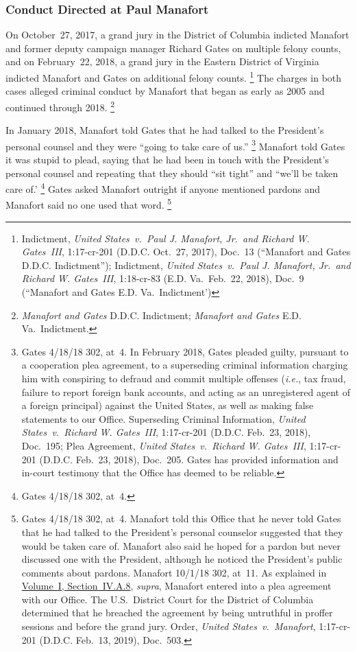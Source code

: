 \subsubsection{Conduct Directed at Paul Manafort}

On October~27, 2017, a grand jury in the District of Columbia indicted Manafort and former deputy campaign manager Richard Gates on multiple felony counts, and on February~22, 2018, a grand jury in the Eastern District of Virginia indicted Manafort and Gates on additional felony counts.%
\footnote{Indictment, \textit{United States~v.\ Paul J. Manafort, Jr.\ and Richard W. Gates~III}, 1:17-cr-201 (D.D.C. Oct.~27, 2017), Doc.~13 (``Manafort and Gates D.D.C. Indictment'');
Indictment, \textit{United States~v.\ Paul J. Manafort, Jr.\ and Richard W. Gates~III}, 1:18-cr-83 (E.D. Va.\ Feb.~22, 2018), Doc.~9 (``Manafort and Gates E.D. Va.\ Indictment')}
The charges in both cases alleged criminal conduct by Manafort that began as early as 2005 and continued through 2018.%
\footnote{\textit{Manafort and Gates} D.D.C. Indictment; \textit{Manafort and Gates} E.D. Va.\ Indictment.}

In January 2018, Manafort told Gates that he had talked to the President's personal counsel and they were ``going to take care of us.''%
\footnote{Gates 4/18/18 302, at~4.
In February 2018, Gates pleaded guilty, pursuant to a cooperation plea agreement, to a superseding criminal information charging him with conspiring to defraud and commit multiple offenses (\textit{i.e.}, tax fraud, failure to report foreign bank accounts, and acting as an unregistered agent of a foreign principal) against the United States, as well as making false statements to our Office.
Superseding Criminal Information, \textit{United States~v.\ Richard W. Gates~III}, 1:17-cr-201 (D.D.C. Feb.~23, 2018), Doc.~195;
Plea Agreement, \textit{United States~v.\ Richard W. Gates~III}, 1:17-cr-201 (D.D.C. Feb.~23, 2018), Doc.~205.
Gates has provided information and in-court testimony that the Office has deemed to be reliable.}
Manafort told Gates it was stupid to plead, saying that he had been in touch with the President's personal counsel and repeating that they should ``sit tight'' and ``we'll be taken care of.'%
\footnote{Gates 4/18/18 302, at~4.}
Gates asked Manafort outright if anyone mentioned pardons and Manafort said no one used that word.%
\footnote{Gates 4/18/18 302, at~4.
Manafort told this Office that he never told Gates that he had talked to the President's personal counselor suggested that they would be taken care of.
Manafort also said he hoped for a pardon but never discussed one with the President, although he noticed the President's public comments about pardons.
Manafort 10/1/18 302, at~11.
As explained in \hyperlink{subsubsection.1.4.1.8}{Volume~I, Section~IV.A.8}, \textit{supra}, Manafort entered into a plea agreement with our Office.
The U.S.~District Court for the District of Columbia determined that he breached the agreement by being untruthful in proffer sessions and before the grand jury.
Order, \textit{United States~v.\ Manafort}, 1:17-cr-201 (D.D.C. Feb.~13, 2019), Doc.~503.}

